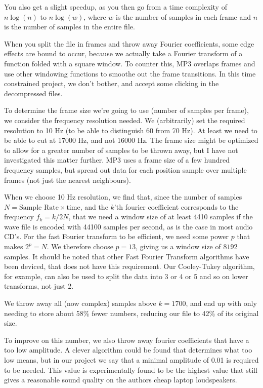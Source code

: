 \documentclass[a4paper,11pt]{article}
\begin{document}
You also get a slight speedup, as you then go from a time complexity
of  $n\log(n)$ to $n\log(w)$, where $w$ is the number of samples in each frame
and $n$ is the number of samples in the entire file.


When you split the file in frames and throw away Fourier coefficients,
some edge effects are bound to occur, because we actually take a Fourier transform
of a function folded with a square window. To counter this,
MP3 overlaps frames and use other windowing functions to smoothe
out the frame transitions. In this time constrained project,
we don't bother, and accept some clicking in the decompressed files.


To determine the frame size we're going to use (number of samples per frame),
we consider the frequency resolution needed. We (arbitrarily) set
the required resolution to 10 Hz (to be able to distinguish 60 from 70 Hz).
At least we need to be able to cut at 17000 Hz, and not 16000 Hz.
The frame size might be optimized to allow for a greater number
of samples to be thrown away, but I have not investigated this matter further.
MP3 uses a frame size of a few hundred frequency samples, but spread out
data for each position sample over multiple frames (not just the nearest neighbours).


When we choose 10 Hz resolution, we find that, since the number of samples $N = \text{Sample
Rate} \times \text{time}$, and the $k$'th fourier coefficient
corresponds to the frequency $f_k = k/2N$,
that we need a window size of at least 4410 samples if the wave file
is encoded with 44100 samples per second, as is the case in most audio CD's.
For the fast Fourier transform to be efficient,
we need some power $p$ that makes $2^p =N$. We therefore choose $p = 13$,
giving us a window size of $8192$ samples. It should be noted that
other Fast Fourier Transform algorithms have been deviced, that does
not have this requirement. Our Cooley-Tukey algorithm, for example,
can also be used to split the data into 3 or 4 or 5 and so on lower transforms, not just 2.

We throw away all (now complex) samples above $k = 1700$,
and end up with only needing to store about 58\% fewer numbers,
reducing our file to 42\% of its original size.

To improve on this number, we also throw away fourier coefficients that
have a too low amplitude. A clever algorithm could be found that determines
what too low means, but in our project we say that a minimal amplitude
of 0.01 is required to be needed. This value is experimentally found to be
the highest value that still gives a reasonable sound quality
on the authors cheap laptop loudspeakers.
\end{document}
